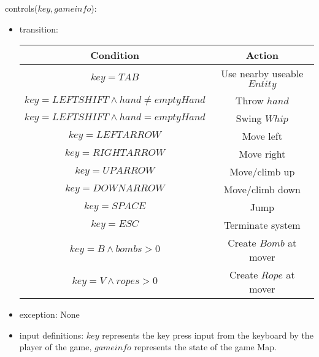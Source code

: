 \documentclass[12pt]{article}
\begin{document}
\newpage
\noindent controls($key, gameinfo$):
\begin{itemize}
    \item transition: \begin{table}[!h]
        \centering
        \begin{tabular}{|c|c|}
            \hline
            Condition & Action\\
            \hline
            $key = TAB$ & Use nearby useable $Entity$ \\
            \hline
            $key = LEFTSHIFT \land hand \neq emptyHand$ & Throw $hand$\\
            \hline
            $key = LEFTSHIFT \land hand = emptyHand$ & Swing $Whip$\\
            \hline
            $key = LEFTARROW$ & Move left\\
            \hline
            $key = RIGHTARROW$ & Move right\\
            \hline
            $key = UPARROW$ & Move/climb up\\
            \hline
            $key = DOWNARROW$ & Move/climb down\\
            \hline
            $key = SPACE$ & Jump\\
            \hline
            $key = ESC$ & Terminate system\\
            \hline
            $key = B \land bombs > 0$ & Create $Bomb$ at mover\\
            \hline
            $key = V \land ropes > 0$ & Create $Rope$ at mover\\
            \hline
        \end{tabular}
    \end{table}
    \item exception: None
    \item input definitions: $key$ represents the key press input from the keyboard by the player of the game, $gameinfo$ represents the state of the game Map.
\end{itemize}
\end{document}
